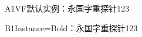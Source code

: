 \documentclass[fontset=none]{ctexart}
\begin{document}
\fontsize{22pt}{36pt}\selectfont
A1VF默认实例：永国字重探针123

B1Instance=Bold：{\vfInst 永国字重探针123}
\end{document}
